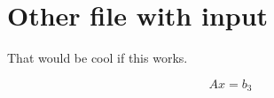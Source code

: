 \section{Other file with input}

That would be cool if this works.

\begin{equation}
    Ax=b_3
\end{equation}

